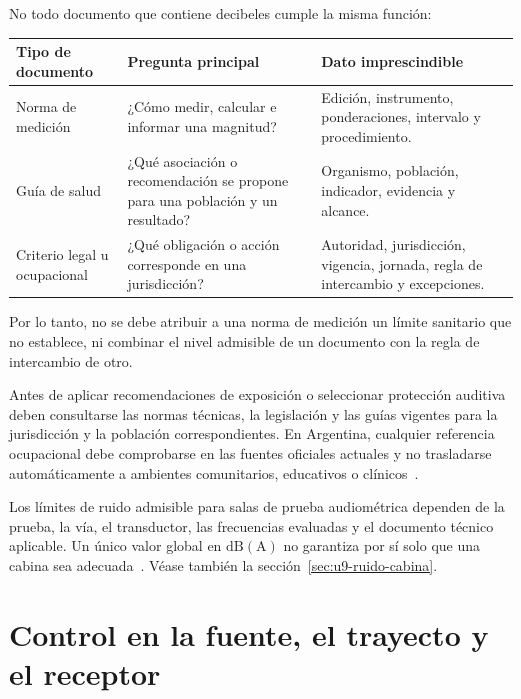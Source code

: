 No todo documento que contiene decibeles cumple la misma función:
\begin{center}
\begin{tabular}{|
    >{\raggedright\arraybackslash}p{}|
    >{\raggedright\arraybackslash}p{}|
    >{\raggedright\arraybackslash}p{}|}
    \hline
    \textbf{Tipo de documento} & \textbf{Pregunta principal} &
    \textbf{Dato imprescindible} \\
    \hline
    Norma de medición & ¿Cómo medir, calcular e informar una magnitud? &
    Edición, instrumento, ponderaciones, intervalo y procedimiento. \\
    \hline
    Guía de salud & ¿Qué asociación o recomendación se propone para una
    población y un resultado? &
    Organismo, población, indicador, evidencia y alcance. \\
    \hline
    Criterio legal u ocupacional & ¿Qué obligación o acción corresponde en
    una jurisdicción? &
    Autoridad, jurisdicción, vigencia, jornada, regla de intercambio y
    excepciones. \\
    \hline
\end{tabular}
\end{center}

Por lo tanto, no se debe atribuir a una norma de medición un límite sanitario
que no establece, ni combinar el nivel admisible de un documento con la regla
de intercambio de otro.

Antes de aplicar recomendaciones de exposición o seleccionar
protección auditiva deben consultarse las normas técnicas, la legislación y
las guías vigentes para la jurisdicción y la población correspondientes. En
Argentina, cualquier referencia ocupacional debe comprobarse en las fuentes
oficiales actuales y no trasladarse automáticamente a ambientes comunitarios,
educativos o clínicos~\cite{argentinaLey19587,argentinaDecreto351,argentinaResolucion85}.

Los límites de ruido admisible para salas de prueba audiométrica
dependen de la prueba, la vía, el transductor, las frecuencias evaluadas y el
documento técnico aplicable. Un único valor global en \(\mathrm{dB(A)}\) no
garantiza por sí solo que una cabina sea adecuada~\cite{iso8253_1_2010,ansiS31_2023}. Véase también la
sección~\ref{sec:u9-ruido-cabina}.

\section{Control en la fuente, el trayecto y el receptor}
\label{sec:u10-control}

